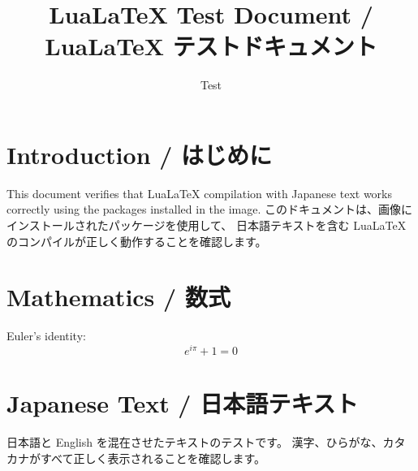 \documentclass{article}
\title{LuaLaTeX Test Document / LuaLaTeX テストドキュメント}
\author{Test}
\date{}
\begin{document}
\maketitle

\section{Introduction / はじめに}
This document verifies that LuaLaTeX compilation with Japanese text works
correctly using the packages installed in the image.
このドキュメントは、画像にインストールされたパッケージを使用して、
日本語テキストを含む LuaLaTeX のコンパイルが正しく動作することを確認します。

\section{Mathematics / 数式}
Euler's identity:
\begin{equation}
  e^{i\pi} + 1 = 0
\end{equation}

\section{Japanese Text / 日本語テキスト}
日本語と English を混在させたテキストのテストです。
漢字、ひらがな、カタカナがすべて正しく表示されることを確認します。
\end{document}
